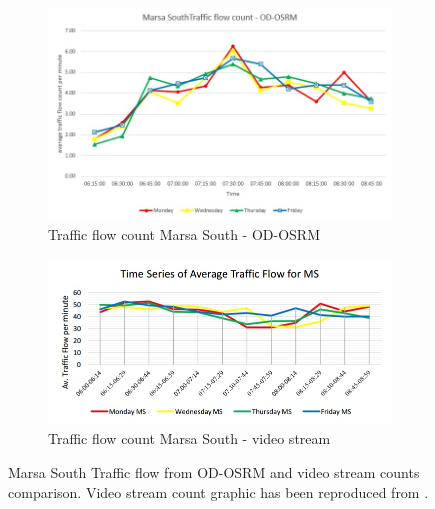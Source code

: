 \documentclass[12pt, a4paper]{report}
\theoremstyle{definition}
\theoremstyle{definition}%
\theoremstyle{definition}%
\theoremstyle{definition}%
\theoremstyle{definition}%
\theoremstyle{definition}%
\begin{document}
\begin{figure}[!] 
	\centering
	\begin{subfigure}{0.7\textwidth}
		\centering
		\includegraphics[width=\linewidth]{traffic_flow_count_MS_MINE.jpg} 
		\caption{\scriptsize{Traffic flow count Marsa South - OD-OSRM}} 
		\label{fig:traffic_flow_count_MS_MINE}
	\end{subfigure}
	
	\vspace{1cm}
	\begin{subfigure}{0.7\textwidth}
		\centering
		\includegraphics[width=\linewidth]{traffic_flow_count_MS_Nigel_pace.jpg} 
		\caption{\scriptsize{Traffic flow count Marsa South - video stream}}
		\label{fig:traffic_flow_count_MS_NP}
	\end{subfigure}
	
	\caption[Line chart for Marsa northbound and southbound traffic flow]{Marsa South Traffic flow from OD-OSRM and video stream counts comparison. Video stream count graphic has been reproduced from \cite{Pace2017}.}
	\label{fig:marsa_south_traffic_flow_line_chart}
\end{figure}
\end{document}
